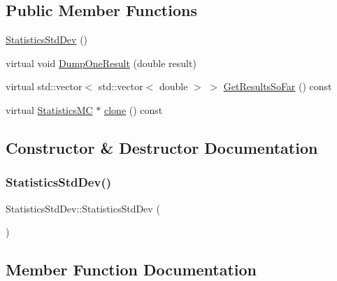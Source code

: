 \subsection*{Public Member Functions}
\begin{DoxyCompactItemize}
\item 
\hyperlink{classStatisticsStdDev_a2e934123d1e291cfe3d1ea9576ebc1f1}{Statistics\+Std\+Dev} ()
\item 
virtual void \hyperlink{classStatisticsStdDev_a824017c76562426a4fd640ef8a909a5e}{Dump\+One\+Result} (double result)
\item 
virtual std\+::vector$<$ std\+::vector$<$ double $>$ $>$ \hyperlink{classStatisticsStdDev_aacb0a24c646c6c664cadbca82c2ddfdd}{Get\+Results\+So\+Far} () const
\item 
virtual \hyperlink{classStatisticsMC}{Statistics\+MC} $\ast$ \hyperlink{classStatisticsStdDev_a13d8861fc23c9bb99e46e725e014a6b9}{clone} () const
\end{DoxyCompactItemize}


\subsection{Constructor \& Destructor Documentation}
\hypertarget{classStatisticsStdDev_a2e934123d1e291cfe3d1ea9576ebc1f1}{}\label{classStatisticsStdDev_a2e934123d1e291cfe3d1ea9576ebc1f1} 
\subsubsection{\texorpdfstring{Statistics\+Std\+Dev()}{StatisticsStdDev()}}
{\footnotesize\ttfamily Statistics\+Std\+Dev\+::\+Statistics\+Std\+Dev (\begin{DoxyParamCaption}{ }\end{DoxyParamCaption})}



\subsection{Member Function Documentation}
\hypertarget{classStatisticsStdDev_a13d8861fc23c9bb99e46e725e014a6b9}{}\label{classStatisticsStdDev_a13d8861fc23c9bb99e46e725e014a6b9} 
